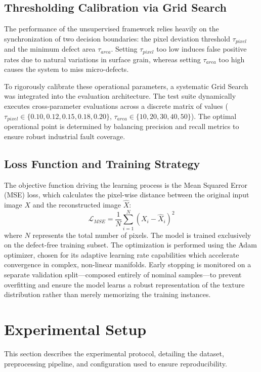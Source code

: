 \documentclass[10pt,twocolumn,a4paper]{article}
\begin{document}
\subsection{Thresholding Calibration via Grid Search}
The performance of the unsupervised framework relies heavily on the synchronization of two decision boundaries: the pixel deviation threshold $\tau_{pixel}$ and the minimum defect area $\tau_{area}$. Setting $\tau_{pixel}$ too low induces false positive rates due to natural variations in surface grain, whereas setting $\tau_{area}$ too high causes the system to miss micro-defects. 

To rigorously calibrate these operational parameters, a systematic Grid Search was integrated into the evaluation architecture. The test suite dynamically executes cross-parameter evaluations across a discrete matrix of values ($\tau_{pixel} \in \{0.10, 0.12, 0.15, 0.18, 0.20\}$, $\tau_{area} \in \{10, 20, 30, 40, 50\}$). The optimal operational point is determined by balancing precision and recall metrics to ensure robust industrial fault coverage.




\subsection{Loss Function and Training Strategy}
The objective function driving the learning process is the Mean Squared Error (MSE) loss, which calculates the pixel-wise distance between the original input image $X$ and the reconstructed image $\hat{X}$:
\begin{equation}
    \mathcal{L}_{MSE} = \frac{1}{N} \sum_{i=1}^{N} (X_i - \hat{X}_i)^2
\end{equation}
where $N$ represents the total number of pixels. The model is trained exclusively on the defect-free training subset. The optimization is performed using the Adam optimizer, chosen for its adaptive learning rate capabilities which accelerate convergence in complex, non-linear manifolds. Early stopping is monitored on a separate validation split—composed entirely of nominal samples—to prevent overfitting and ensure the model learns a robust representation of the texture distribution rather than merely memorizing the training instances.
	
	\section{Experimental Setup}

This section describes the experimental protocol, detailing the dataset, preprocessing pipeline, and configuration used to ensure reproducibility.
\end{document}
